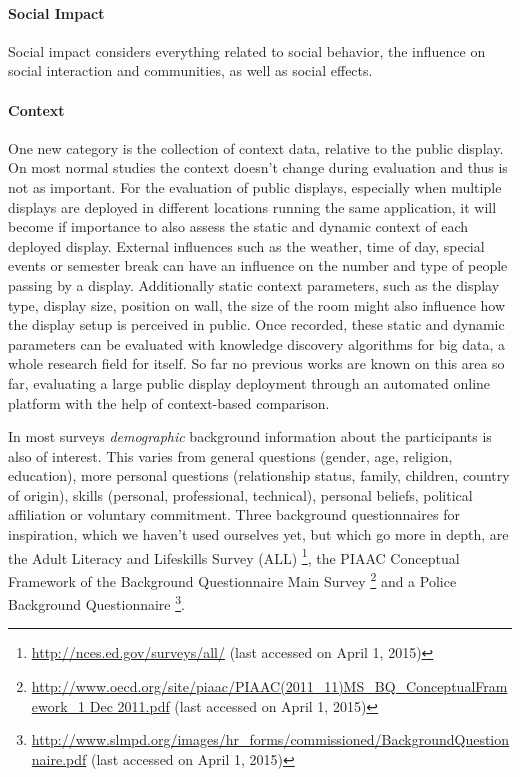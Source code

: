 	\paragraph{Social Impact}
		Social impact considers everything related to social behavior, the influence on social interaction and communities, as well as social effects.

	\paragraph{Context}

		One new category is the collection of context data, relative to the public display. On most normal studies the context doesn't change during evaluation and thus is not as important. For the evaluation of public displays, especially when multiple displays are deployed in different locations running the same application, it will become if importance to also assess the static and dynamic context of each deployed display. External influences such as the weather, time of day, special events or semester break can have an influence on the number and type of people passing by a display. Additionally static context parameters, such as the display type, display size, position on wall, the size of the room might also influence how the display setup is perceived in public. Once recorded, these static and dynamic parameters can be evaluated with knowledge discovery algorithms for big data, a whole research field for itself. 
		So far no previous works are known on this area so far, evaluating a large public display deployment through an automated online platform with the help of context-based comparison. 

	
		In most surveys \textit{demographic} background information about the participants is also of interest. This varies from general questions (gender, age, religion, education), more personal questions (relationship status, family, children, country of origin), skills (personal, professional, technical), personal beliefs, political affiliation or voluntary commitment.
		Three background questionnaires for inspiration, which we haven't used ourselves yet, but which go more in depth, are the Adult Literacy and Lifeskills Survey (ALL) \footnote{\url{http://nces.ed.gov/surveys/all/} (last accessed on April 1, 2015)}, the PIAAC Conceptual Framework of the Background Questionnaire Main Survey \footnote{\url{http://www.oecd.org/site/piaac/PIAAC(2011_11)MS_BQ_ConceptualFramework_1 Dec 2011.pdf} (last accessed on April 1, 2015)} and a Police Background Questionnaire \footnote{\url{http://www.slmpd.org/images/hr_forms/commissioned/BackgroundQuestionnaire.pdf} (last accessed on April 1, 2015)}.


